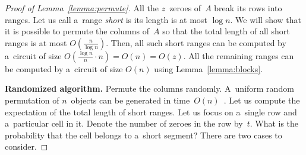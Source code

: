 \begin{proof}[Proof of Lemma~\ref{lemma:permute}]
All the $z$~zeroes of~$A$ break its rows into ranges.
Let us call a~range {\em short} is its length is at most $\log n$.
We will show that it is possible to permute the columns of~$A$
so that the total length of all short ranges is at most $O(\frac{n}{\log n})$.
Then, all such short ranges can be computed by a~circuit of size
$O(\frac{\log n}{n} \cdot n)=O(n)=O(z)$. All the remaining ranges can be
computed by a~circuit of size $O(n)$ using Lemma~\ref{lemma:blocks}.


\textbf{Randomized algorithm.}
Permute the columns randomly. A~uniform random permutation
of $n$~objects can be generated in
time~$O(n)$~\cite[Algorithm~P (Shuffling)]{DBLP:books/lib/Knuth98}.
Let us compute the expectation of
the total length of short ranges.
Let us focus on a~single row and a~particular cell in it. Denote the number of
zeroes in the row by~$t$. What is the probability that the cell belongs to
a~short segment? There are two cases to consider.



\end{proof}
